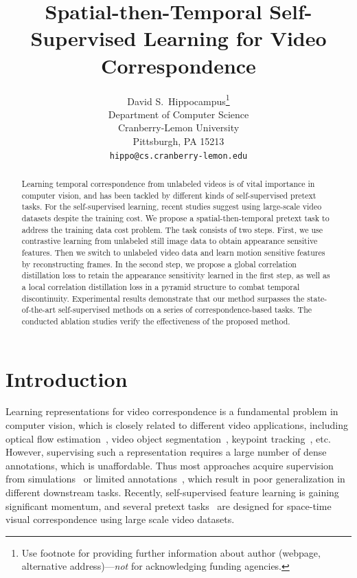 \documentclass{article}
\title{Spatial-then-Temporal Self-Supervised Learning for Video Correspondence}
\author{%
  David S.~Hippocampus\thanks{Use footnote for providing further information
    about author (webpage, alternative address)---\emph{not} for acknowledging
    funding agencies.} \\
  Department of Computer Science\\
  Cranberry-Lemon University\\
  Pittsburgh, PA 15213 \\
  \texttt{hippo@cs.cranberry-lemon.edu} \\
}
\begin{document}
\maketitle


\begin{abstract}
  Learning temporal correspondence from unlabeled videos is of vital importance in computer vision, and has been tackled by different kinds of self-supervised pretext tasks. For the self-supervised learning, recent studies suggest using large-scale video datasets despite the training cost. We propose a spatial-then-temporal pretext task to address the training data cost problem. The task consists of two steps. First, we use contrastive learning from unlabeled still image data to obtain appearance sensitive features. Then we switch to unlabeled video data and learn motion sensitive features by reconstructing frames. In the second step, we propose a global correlation distillation loss to retain the appearance sensitivity learned in the first step, as well as a local correlation distillation loss in a pyramid structure to combat temporal discontinuity. Experimental results demonstrate that our method surpasses the state-of-the-art self-supervised methods on a series of correspondence-based tasks. The conducted ablation studies verify the effectiveness of the proposed method.
\end{abstract}



\section{Introduction}
Learning representations for video correspondence is a fundamental problem in computer vision, which is closely related to different video applications, including optical flow estimation~\cite{dosovitskiy2015flownet}\cite{horn1981determining}, video object segmentation~\cite{caelles2017one}\cite{oh2019video}, keypoint tracking~\cite{xiu2018pose}, etc. However, supervising such a representation requires a large number of dense annotations, which is unaffordable. Thus most approaches acquire supervision from simulations~\cite{dosovitskiy2015flownet}\cite{mayer2016large} or limited annotations~\cite{pont20172017}\cite{xu2018youtube}, which result in poor generalization in different downstream tasks. Recently, self-supervised feature learning is gaining significant momentum, and several pretext tasks~\cite{jabri2020space}\cite{lai2020mast}\cite{li2019joint}\cite{wang2019learning}\cite{xu2021rethinking} are designed for space-time visual correspondence using large scale video datasets.
\vspace{-1mm}
\end{document}
